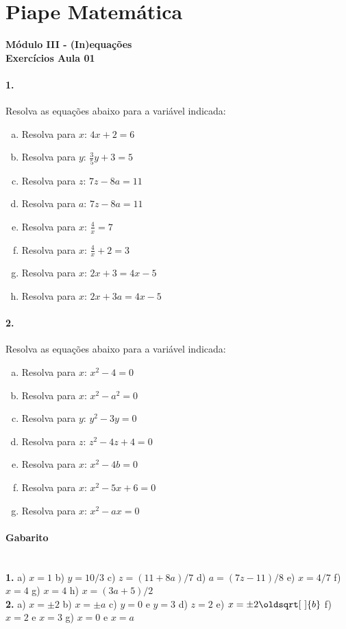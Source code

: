 \documentclass[a4paper,12pt]{article}
\renewcommand*{\sqrt}[2][\ ]{\oldsqrt[#1]{#2}}
\begin{document}
 
  
\section*{Piape Matemática} 
\textbf{Módulo III - (In)equações}\\
\textbf{Exercícios Aula 01}         
\begin{multicols}{2}
\paragraph*{1.} Resolva as equações abaixo para a variável indicada:

\begin{enumerate}[a)] 
    \item Resolva para $x$: $4x + 2 = 6$
    \item Resolva para $y$:  $\frac{3}{5}y + 3 = 5$
    \item Resolva para $z$:  $7z - 8a = 11$
    \item Resolva para $a$:  $7z - 8a = 11$
    \item Resolva para $x$: $\frac{4}{x} = 7$
    \item Resolva para $x$: $\frac{4}{x} + 2 = 3$
    \item Resolva para $x$: $2x + 3 = 4x -5$
    \item Resolva para $x$: $2x + 3a = 4x -5$
\end{enumerate}

\paragraph*{2.} Resolva as equações abaixo para a variável indicada:
\begin{enumerate}[a)]
    \item Resolva para $x$: $x^2 - 4 = 0$
    \item Resolva para $x$: $x^2 - a^2 = 0$
    \item Resolva para $y$: $y^2 - 3y = 0$
    \item Resolva para $z$: $z^2 - 4z + 4 = 0$
    \item Resolva para $x$: $x^2 - 4b = 0$
    \item Resolva para $x$: $x^2 - 5x + 6 = 0$
    \item Resolva para $x$: $x^2 - ax = 0$
\end{enumerate}
\vspace*{0cm}
\end{multicols}
 
\vspace*{\fill}
{\footnotesize
\paragraph*{Gabarito} \hspace*{\fill}\\
\textbf{1.}
 a) $x =1$ b) $y = 10/3$ c) $z= (11+8a)/7$ d) $a = (7z-11)/8$ e) $x = 4/7$ f) $x = 4$ g) $x = 4$ h) $x = (3a+5)/2$ \\
\textbf{2.}
a) $x = \pm 2$ b) $x = \pm a$ c) $y = 0$ e $y = 3$ d) $z = 2$ e) $x = \pm 2\sqrt{b}$ f) $x = 2$ e $x = 3$ g) $x = 0$ e $x = a$
}
\end{document}
